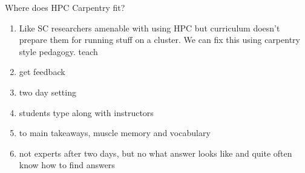 \begin{frame}{Where does HPC Carpentry fit?}
	\begin{enumerate}
		\item Like SC researchers amenable with using HPC but curriculum doesn't prepare them for running stuff on a cluster. We can fix this using carpentry style pedagogy.
		teach
		\item get feedback
		\item two day setting
		\item students type along with instructors
		\item to main takeaways, muscle memory and vocabulary
		\item not experts after two days, but no what answer looks like and quite often know how to find answers
	\end{enumerate}
	
	\note{}
\end{frame}